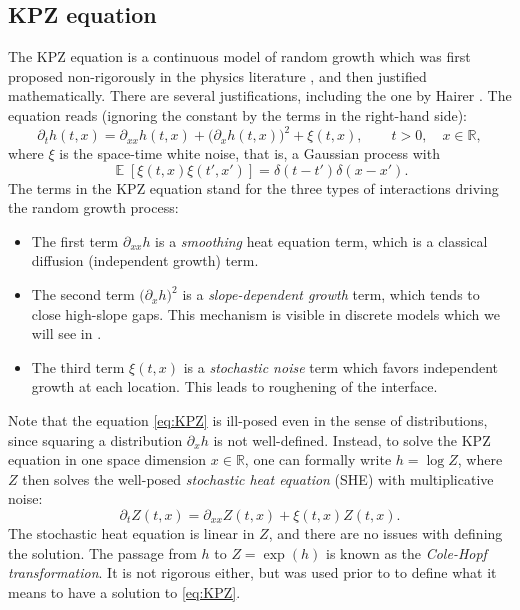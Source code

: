 \documentclass[letterpaper,11pt,oneside,reqno]{article}
\numberwithin{equation}{section}
\theoremstyle{definition}
\begin{document}
\subsection{KPZ equation}

The KPZ equation is a continuous model of random growth which was first proposed
non-rigorously in the physics literature \cite{KPZ1986}, and then
justified mathematically. There are several justifications,
including the one by Hairer \cite{Hairer11}.
The equation reads (ignoring the constant by the terms in the right-hand side):
\begin{equation}
	\label{eq:KPZ}
	\partial_t h(t,x) = \partial_{xx} h(t,x)+\big(\partial_x h(t,x)\big)^2 + \xi(t,x),
	\qquad t>0,\quad x\in\mathbb{R},
\end{equation}
where $\xi$ is the space-time white noise, that is, a Gaussian process with
\begin{equation*}
	\operatorname{\mathbb{E}}[\xi(t,x)\xi(t',x')] = \delta(t-t')\delta(x-x').
\end{equation*}
The terms in the KPZ equation stand for the three types of interactions
driving the random growth process:
\begin{itemize}
	\item The first term $\partial_{xx} h$ is a
		\emph{smoothing} heat equation term, which is a
		classical diffusion (independent growth) term.
	\item The second term $\big(\partial_x h\big)^2$ is a \emph{slope-dependent growth} term, which
		tends to close high-slope gaps. This mechanism is visible in discrete models
		which we will see in .
	\item The third term $\xi(t,x)$ is a \emph{stochastic noise} term
		which favors independent growth at each location.
		This leads to roughening of the interface.
\end{itemize}

Note that the equation \eqref{eq:KPZ}
is ill-posed even in the sense of distributions,
since squaring a distribution $\partial_x h$ is not well-defined.
Instead, to solve the KPZ equation in one space dimension $x\in\mathbb{R}$,
one can formally write $h=\log Z$, where $Z$ then solves the well-posed
\emph{stochastic heat equation} (SHE) with multiplicative noise:
\begin{equation*}
	\partial_t Z(t,x) = \partial_{xx} Z(t,x) + \xi(t,x)Z(t,x).
\end{equation*}
The stochastic heat equation is linear in $Z$, and there are no issues with
defining the solution. The passage from $h$ to $Z=\exp(h)$ is known as the
\emph{Cole-Hopf transformation}. It is not rigorous either, but
was used prior to \cite{Hairer11} to define what it means to have a solution
to \eqref{eq:KPZ}.
\end{document}

